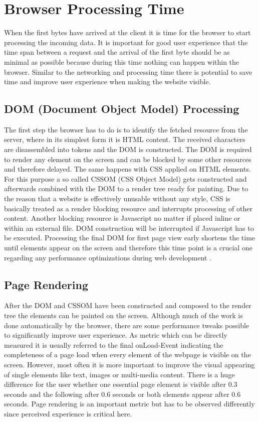 \section{Browser Processing Time}
\label{sec:browserProc}

When the first bytes have arrived at the client it is time for the browser to start processing the incoming data. It is important for good user experience that the time span between a request and the arrival of the first byte should be as minimal as possible because during this time nothing can happen within the browser. Similar to the networking and processing time there is potential to save time and improve user experience when making the website visible. 

\subsection{DOM (Document Object Model) Processing}
The first step the browser has to do is to identify the fetched resource from the server, where in its simplest form it is HTML content. The received characters are disassembled into tokens and the DOM is constructed. The DOM is required to render any element on the screen and can be blocked by some other resources and therefore delayed. The same happens with CSS applied on HTML elements. For this purpose a so called CSSOM (CSS Object Model) gets constructed and afterwards combined with the DOM to a render tree ready for painting. Due to the reason that a website is effectively unusable without any style, CSS is basically treated as a render blocking resource and interrupts processing of other content. Another blocking resource is Javascript no matter if placed inline or within an external file. DOM construction will be interrupted if Javascript has to be executed. Processing the final DOM for first page view early shortens the time until elements appear on the screen and therefore this time point is a crucial one regarding any performance optimizations during web development \cite{GoogleDev} .

\subsection{Page Rendering}
After the DOM and CSSOM have been constructed and composed to the render tree the elements can be painted on the screen. Although much of the work is done automatically by the browser, there are some performance tweaks possible to significantly improve user experience. As metric which can be directly measured it is usually referred to the final onLoad-Event indicating the completeness of a page load when every element of the webpage is visible on the screen. However, most often it is more important to improve the visual appearing of single elements like text, images or multi-media content. There is a huge difference for the user whether one essential page element is visible after 0.3 seconds and the following after 0.6 seconds or both elements appear after 0.6 seconds. Page rendering is an important metric but has to be observed differently since perceived experience is critical here.